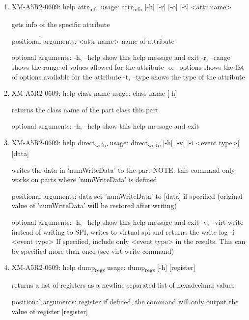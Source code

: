 \documentclass[11pt]{article}
\begin{document}
\begin{enumerate}
\item XM-A5R2-0609: help attr\textsubscript{info}
\label{sec:orgb9c6572}
usage: attr\textsubscript{info} [-h] [-r] [-o] [-t] <attr name>

gets info of the specific attribute

positional arguments:
  <attr name>    name of attribute

optional arguments:
  -h, --help     show this help message and exit
  -r, --range    shows the range of values allowed for the attribute
  -o, --options  shows the list of options available for the attribute
  -t, --type     shows the type of the attribute

\item XM-A5R2-0609: help class-name
\label{sec:org1ed4f2b}
usage: class-name [-h]

returns the class name of the part class this part

optional arguments:
  -h, --help  show this help message and exit

\item XM-A5R2-0609: help direct\textsubscript{write}
\label{sec:org617bf23}
usage: direct\textsubscript{write} [-h] [-v] [-i <event type>] [data]

writes the data in 'numWriteData' to the part NOTE: this command only works on
parts where 'numWriteData' is defined

positional arguments:
  data              set 'numWriteData' to [data] if specified (original value
                    of 'numWriteData' will be restored after writing)

optional arguments:
  -h, --help        show this help message and exit
  -v, --virt-write  instead of writing to SPI, writes to virtual spi and
                    returns the write log
  -i <event type>   If specified, include only <event type> in the results.
                    This can be specified more than once (see virt-write
                    command)

\item XM-A5R2-0609: help dump\textsubscript{regs}
\label{sec:org2e23e6b}
usage: dump\textsubscript{regs} [-h] [register]

returns a list of registers as a newline separated list of hexadecimal values

positional arguments:
  register    if defined, the command will only output the value of register
              [register]


\end{enumerate}
\end{document}
